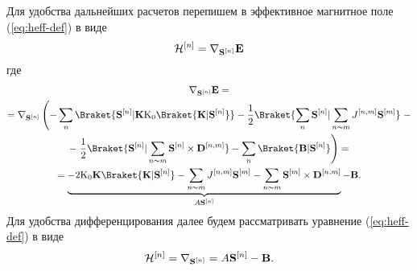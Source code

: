 Для удобства дальнейших расчетов перепишем в эффективное магнитное поле
(\ref{eq:heff-def}) в виде
\begin{equation}
    \mathcal{H}^{[n]} = \nabla_{\mathbf S^{[n]}}\mathbf{E}
\end{equation}
где
\begin{multline}
    \nabla_{\mathbf S^{[n]}}\mathbf E
    =\\=
    \nabla_{\mathbf S^{[n]}} \left({%
    -\sum_n \Braket{\mathbf S^{[n]} | \mathbf K \mathrm{K_0}\Braket{\mathbf K |
    \mathbf S^{[n]}}} - \frac12 \Braket{\sum_n \mathbf S^{[n]} |
    \sum_{n\thicksim m} J^{[n,m]}\mathbf S^{[m]}}
    }\right.-\\-\left.{%
    \frac12\Braket{\mathbf S^{[n]} | \sum_{n\thicksim m} \mathbf S^{[n]} \times
    \mathbf D^{[n,m]}}
    -
    \sum_n \Braket{\mathbf B | \mathbf S^{[n]}}
    }\right)
    =\\=
    \underbrace{%
    -2\mathrm{K_0}\mathbf K \Braket{\mathbf K | \mathbf S^{[n]}}
    -
    \sum_{n\thicksim m}J^{[n,m]}\mathbf S^{[m]} - \sum_{n\thicksim m}
    \mathbf S^{[m]}\times \mathbf D^{[n,m]}
    }_{A\mathbf S^{[n]}}
    -
    \mathbf B.
\end{multline}
Для удобства дифференцирования далее будем рассматривать уравнение
(\ref{eq:heff-def}) в виде
\begin{equation}
    \mathcal{H}^{[n]}=\nabla_{\mathbf S^{[n]}} = A\mathbf S^{[n]} - \mathbf B.
\end{equation}
